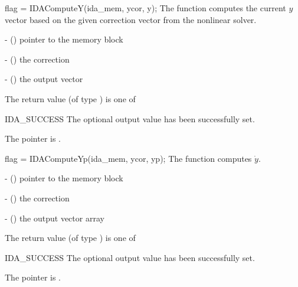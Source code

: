 {
  flag = IDAComputeY(ida\_mem, ycor, y);
}
{
  The function computes the current $y$ vector based on the given correction
  vector from the nonlinear solver.
}
{
  \begin{args}
    \item {} - () pointer to the {\ida} memory block
    \item {} - () the correction
    \item {} - () the output vector
  \end{args}
}
{
  The return value  (of type ) is one of
  \begin{args}
  \item[IDA\_SUCCESS]
    The optional output value has been successfully set.
  \item[\Id{IDA\_MEM\_NULL}]
    The  pointer is .
  \end{args}
}
{}

{
  flag = IDAComputeYp(ida\_mem, ycor, yp);
}
{
  The function computes $\dot{y}$.
}
{
  \begin{args}
    \item {} - () pointer to the {\ida} memory block
    \item {} - () the correction
    \item {} - () the output vector array
  \end{args}
}
{
  The return value  (of type ) is one of
  \begin{args}
  \item[IDA\_SUCCESS]
    The optional output value has been successfully set.
  \item[\Id{IDA\_MEM\_NULL}]
    The  pointer is .
  \end{args}
}
{}



